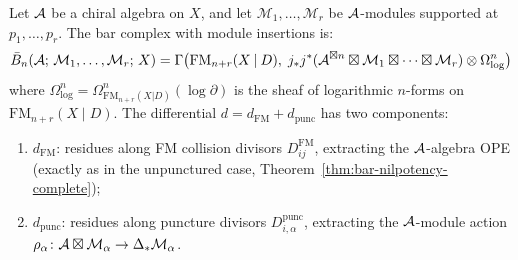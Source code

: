 \begin{theorem}
\label{thm:bar-punctured-curve}
Let $\mathcal{A}$ be a chiral algebra on $X$, and let
$\mathcal{M}_1, \ldots, \mathcal{M}_r$ be $\mathcal{A}$-modules
supported at $p_1, \ldots, p_r$.  The bar complex with module
insertions is:
\begin{equation}\label{eq:bar-punctured}
\bar{B}_n(\mathcal{A};\, \mathcal{M}_1, \ldots, \mathcal{M}_r;\, X)
= \Gamma\bigl(\mathrm{FM}_{n+r}(X \mathbin{|} D),\;
  j_* j^*(\mathcal{A}^{\boxtimes n}
  \boxtimes \mathcal{M}_1 \boxtimes \cdots
  \boxtimes \mathcal{M}_r)
  \otimes \Omega^n_{\log}\bigr)
\end{equation}
where $\Omega^n_{\log} = \Omega^n_{\mathrm{FM}_{n+r}(X|D)}
(\log \partial)$ is the sheaf of logarithmic $n$-forms
on $\mathrm{FM}_{n+r}(X \mathbin{|} D)$.
The differential
$d = d_{\mathrm{FM}} + d_{\mathrm{punc}}$
has two components:
\begin{enumerate}[label=\textup{(\alph*)}]
\item $d_{\mathrm{FM}}$: residues along FM collision divisors
  $D_{ij}^{\mathrm{FM}}$, extracting the $\mathcal{A}$-algebra OPE
  \textup{(}exactly as in the unpunctured
  case, Theorem~\textup{\ref{thm:bar-nilpotency-complete})};
\item $d_{\mathrm{punc}}$: residues along puncture divisors
  $D_{i,\alpha}^{\mathrm{punc}}$, extracting the
  $\mathcal{A}$-module action $\rho_\alpha\colon \mathcal{A} \boxtimes
  \mathcal{M}_\alpha \to \Delta_* \mathcal{M}_\alpha$.
\end{enumerate}
\end{theorem}


